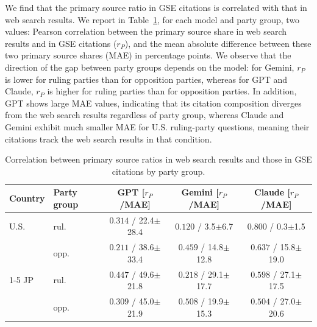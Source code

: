 We find that the primary source ratio in GSE citations is correlated with that in web search results.
We report in Table~\ref{tab:brave-citation-barrier-correlation-party-group}, for each model and party group, two values: Pearson correlation between the primary source share in web search results and in GSE citations ($r_P$), and the mean absolute difference between these two primary source shares (MAE) in percentage points.
We observe that the direction of the gap between party groups depends on the model: for Gemini, $r_P$ is lower for ruling parties than for opposition parties, whereas for GPT and Claude, $r_P$ is higher for ruling parties than for opposition parties.
In addition, GPT shows large MAE values, indicating that its citation composition diverges from the web search results regardless of party group, whereas Claude and Gemini exhibit much smaller MAE for U.S. ruling-party questions, meaning their citations track the web search results in that condition.

\begin{table}[t]
\centering
\footnotesize
\setlength{\tabcolsep}{1.8pt}
\caption{Correlation between primary source ratios in web search results and those in GSE citations by party group.}
\label{tab:brave-citation-barrier-correlation-party-group}
\begin{tabular}{llccc}
\toprule
\textbf{Country} & \textbf{Party group} & \textbf{GPT [$r_P$/MAE]} & \textbf{Gemini [$r_P$/MAE]} & \textbf{Claude [$r_P$/MAE]} \\
\midrule
U.S. & rul. & \textcolor{red!50!black}{$0.314$} / 22.4$\pm$28.4 & \textcolor{red!30!black}{$0.120$} / 3.5$\pm$6.7 & \textcolor{red!90!black}{$0.800$} / 0.3$\pm$1.5 \\
 & opp. & \textcolor{red!30!black}{$0.211$} / 38.6$\pm$33.4 & \textcolor{red!50!black}{$0.459$} / 14.8$\pm$12.8 & \textcolor{red!70!black}{$0.637$} / 15.8$\pm$19.0 \\
\cmidrule(lr){1-5}
JP & rul. & \textcolor{red!50!black}{$0.447$} / 49.6$\pm$21.8 & \textcolor{red!30!black}{$0.218$} / 29.1$\pm$17.7 & \textcolor{red!70!black}{$0.598$} / 27.1$\pm$17.5 \\
 & opp. & \textcolor{red!50!black}{$0.309$} / 45.0$\pm$21.9 & \textcolor{red!70!black}{$0.508$} / 19.9$\pm$15.3 & \textcolor{red!70!black}{$0.504$} / 27.0$\pm$20.6 \\
\bottomrule
\end{tabular}
\end{table}


